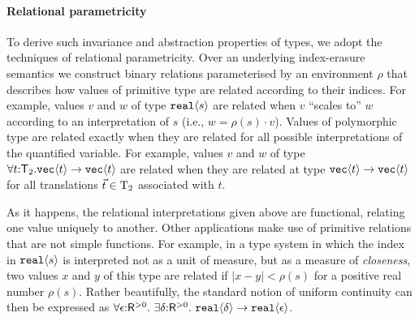 \paragraph{Relational parametricity}
To derive such invariance and abstraction properties of types, we
adopt the techniques of relational parametricity. Over an underlying
index-erasure semantics we construct binary relations parameterised by
an environment $\rho$ that describes how values of primitive type are
related according to their indices.  For example, values $v$ and $w$
of type $\textup{\texttt{real}}\langle s \rangle$ are related when $v$ ``scales to'' $w$
according to an interpretation of $s$ (i.e., $w=\rho(s)\cdot
v$).  Values of polymorphic type are related exactly when they are
related for all possible interpretations of the quantified
variable. For example, values $v$ and $w$ of type
$\forall t\mathord:\mathsf{T}_2.\textup{\texttt{vec}}\langle t \rangle\to
\textup{\texttt{vec}}\langle t \rangle$ are related when they are related at type
$\textup{\texttt{vec}}\langle t \rangle\to\textup{\texttt{vec}}\langle t \rangle$ for all translations
$\vec t\in\mathrm{T}_2$ associated with $t$.

As it happens, the relational interpretations given above are
functional, relating one value uniquely to another. Other applications
make use of primitive relations that are not simple functions.
For example, in a type system in which the index in
$\textup{\texttt{real}}\langle s \rangle$ is interpreted not as a unit of measure, but as
a measure of \emph{closeness}, two values $x$ and $y$ of this type are
related if $|x-y| < \rho(s)$ for a positive real number
$\rho(s)$.  Rather beautifully, the standard notion of uniform
continuity can then be expressed as %
 $ \forall \epsilon \mathord: \mathsf{R}^{>0}.\ \exists \delta\mathord: \mathsf{R}^{>0}.\ \tyPrim{real}{\delta} \to \tyPrim{real}{\epsilon}$.



